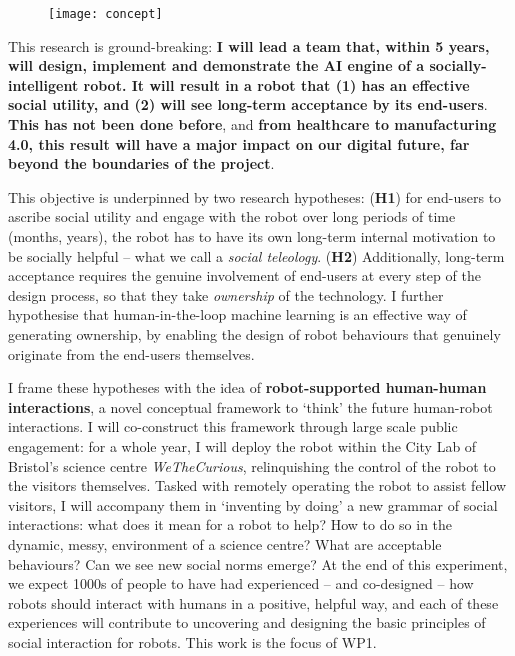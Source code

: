 \begin{figure}
    \centering
    \vspace{-7pt}
    \texttt{[image: concept]}
    \label{fig|concept}
\end{figure}


This research is ground-breaking: \textbf{I will lead a team that, within 5
years, will design, implement and demonstrate the AI engine of a
socially-intelligent robot. It will result in a robot that (1) has an
effective social utility, and (2) will see long-term acceptance by its
end-users}. \textbf{This has not been done before}, and \textbf{from healthcare to manufacturing
4.0, this result will have a major impact on our digital future, far beyond the
boundaries of the project}.

This objective is underpinned by two research hypotheses: (\textbf{H1}) for
end-users to ascribe social utility and engage with the robot over long periods
of time (months, years), the robot has to have its own long-term internal
motivation to be socially helpful -- what we call a \emph{social teleology}. (\textbf{H2})
Additionally, long-term acceptance requires the genuine involvement of end-users
at every step of the design process, so that they take \emph{ownership} of the
technology. I further hypothesise that human-in-the-loop machine learning is an
effective way of generating ownership, by enabling the design of robot
behaviours that genuinely originate from the end-users themselves.






I frame these hypotheses with the idea of \textbf{robot-supported human-human
interactions}, a novel conceptual framework to `think' the future human-robot
interactions. I will co-construct this framework through large scale public
engagement: for a whole year, I will deploy the \project robot within the City
Lab of Bristol's science centre \emph{WeTheCurious}, relinquishing the control
of the robot to the visitors themselves. Tasked with remotely operating the
robot to assist fellow visitors, I will accompany them in `inventing by doing' a
new grammar of social interactions: what does it mean for a robot to help? How
to do so in the dynamic, messy, environment of a science centre? What are acceptable
behaviours? Can we see new social norms emerge? At the end of this experiment,
we expect 1000s of people to have had experienced -- and co-designed -- how
robots should interact with humans in a positive, helpful way, and each of these
experiences will contribute to uncovering and designing the basic principles of
social interaction for robots. This work is the focus of WP1.

